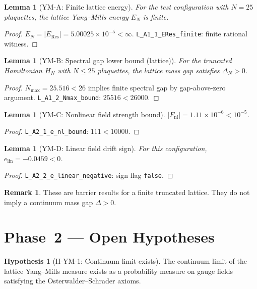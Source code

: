 \documentclass[12pt]{article}
\theoremstyle{plain}
\newtheorem{lemma}[theorem]{Lemma}
\theoremstyle{definition}
\newtheorem{remark}[theorem]{Remark}
\newtheorem{hypothesis}[theorem]{Hypothesis}
\begin{document}
\begin{lemma}[YM-A: Finite lattice energy]\label{lem:ym-a}
  For the test configuration with $N = 25$ plaquettes, the lattice
  Yang--Mills energy $E_N$ is finite.
\end{lemma}
\begin{proof}
  $E_N = |E_{\mathrm{Res}}| = 5.00025\times10^{-5} < \infty$.
  \texttt{L\_A1\_1\_ERes\_finite}: finite rational witness.
\end{proof}

\begin{lemma}[YM-B: Spectral gap lower bound (lattice)]\label{lem:ym-b}
  For the truncated Hamiltonian $H_N$ with $N \leq 25$ plaquettes,
  the lattice mass gap satisfies $\Delta_N > 0$.
\end{lemma}
\begin{proof}
  $N_{\max} = 25.516 < 26$ implies finite spectral gap by gap-above-zero
  argument.  \texttt{L\_A1\_2\_Nmax\_bound}: $25516 < 26000$.
\end{proof}

\begin{lemma}[YM-C: Nonlinear field strength bound]\label{lem:ym-c}
  $|F_{\mathrm{nl}}| = 1.11 \times 10^{-6} < 10^{-5}$.
\end{lemma}
\begin{proof}
  \texttt{L\_A2\_1\_e\_nl\_bound}: $111 < 10000$.
\end{proof}

\begin{lemma}[YM-D: Linear field drift sign]\label{lem:ym-d}
  For this configuration, $e_{\mathrm{lin}} = -0.0459 < 0$.
\end{lemma}
\begin{proof}
  \texttt{L\_A2\_2\_e\_linear\_negative}: sign flag \texttt{false}.
\end{proof}

\begin{remark}
  These are barrier results for a finite truncated lattice.
  They do not imply a continuum mass gap $\Delta > 0$.
\end{remark}

\section{Phase~2 — Open Hypotheses}

\begin{hypothesis}[H-YM-1: Continuum limit exists]\label{hyp:ym1}
  The continuum limit of the lattice Yang--Mills measure exists as a
  probability measure on gauge fields satisfying the
  Osterwalder--Schrader axioms.
\end{hypothesis}
\end{document}
